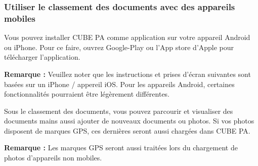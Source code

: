 \vspace{\baselineskip}
\vspace{\baselineskip}
\vspace{\baselineskip}
\vspace{\baselineskip}

\subsubsection{Utiliser le classement des documents avec des appareils mobiles}

Vous pouvez installer CUBE PA comme application sur votre appareil Android ou iPhone. Pour ce faire, ouvrez Google-Play ou l'App store d'Apple pour télécharger l'application.

\vspace{\baselineskip}

\textbf{Remarque :} Veuillez noter que les instructions et prises d'écran suivantes sont basées sur un iPhone / appereil iOS. Pour les appareils Android, certaines fonctionnalités pourraient être légèrement différentes.

\vspace{\baselineskip}

Sous le classement des documents, vous pouvez parcourir et visualiser des documents mains aussi ajouter de nouveaux documents ou photos. Si vos photos disposent de marques GPS, ces dernières seront aussi chargées dans CUBE PA.

\vspace{\baselineskip}

\textbf{Remarque :} Les marques GPS seront aussi traitées lors du chargement de photos d'appareils non mobiles.

\vspace{\baselineskip}

